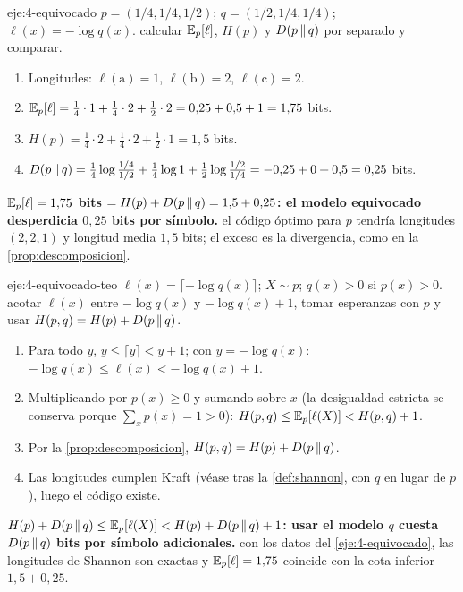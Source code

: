 \begin{solucion}{eje:4-equivocado}
\datos $p=(1/4,1/4,1/2)$; $q=(1/2,1/4,1/4)$; $\ell(x)=-\log q(x)$.
\planteamiento calcular $\mathbb{E}_p[\ell]$, $H(p)$ y $D(p\,\|\,q)$ por separado y comparar.
\pasos
\begin{enumerate}[label=\arabic*.]
  \item Longitudes: $\ell(\mathrm{a})=1$, $\ell(\mathrm{b})=2$, $\ell(\mathrm{c})=2$.
  \item $\mathbb{E}_p[\ell]=\tfrac14\cdot 1+\tfrac14\cdot 2+\tfrac12\cdot 2=0{,}25+0{,}5+1=1{,}75$ bits.
  \item $H(p)=\tfrac14\cdot 2+\tfrac14\cdot 2+\tfrac12\cdot 1=1{,}5$ bits.
  \item $D(p\,\|\,q)=\tfrac14\log\tfrac{1/4}{1/2}+\tfrac14\log 1+\tfrac12\log\tfrac{1/2}{1/4}=-0{,}25+0+0{,}5=0{,}25$ bits.
\end{enumerate}
\resultado \textbf{$\mathbb{E}_p[\ell]=1{,}75$ bits $=H(p)+D(p\,\|\,q)=1{,}5+0{,}25$: el modelo equivocado desperdicia $0{,}25$ bits por símbolo.}
\comprobacion el código óptimo para $p$ tendría longitudes $(2,2,1)$ y longitud media $1{,}5$ bits; el exceso es la divergencia, como en la \cref{prop:descomposicion}.
\end{solucion}

\begin{solucion}{eje:4-equivocado-teo}
\datos $\ell(x)=\lceil-\log q(x)\rceil$; $X\sim p$; $q(x)>0$ si $p(x)>0$.
\planteamiento acotar $\ell(x)$ entre $-\log q(x)$ y $-\log q(x)+1$, tomar esperanzas con $p$ y usar $H(p,q)=H(p)+D(p\,\|\,q)$.
\pasos
\begin{enumerate}[label=\arabic*.]
  \item Para todo $y$, $y\le\lceil y\rceil<y+1$; con $y=-\log q(x)$: $-\log q(x)\le\ell(x)<-\log q(x)+1$.
  \item Multiplicando por $p(x)\ge 0$ y sumando sobre $x$ (la desigualdad estricta se conserva porque $\sum_xp(x)=1>0$): $H(p,q)\le\mathbb{E}_p[\ell(X)]<H(p,q)+1$.
  \item Por la \cref{prop:descomposicion}, $H(p,q)=H(p)+D(p\,\|\,q)$.
  \item Las longitudes cumplen Kraft (véase tras la \cref{def:shannon}, con $q$ en lugar de $p$), luego el código existe.
\end{enumerate}
\resultado \textbf{$H(p)+D(p\,\|\,q)\le\mathbb{E}_p[\ell(X)]<H(p)+D(p\,\|\,q)+1$: usar el modelo $q$ cuesta $D(p\,\|\,q)$ bits por símbolo adicionales.}
\comprobacion con los datos del \cref{eje:4-equivocado}, las longitudes de Shannon son exactas y $\mathbb{E}_p[\ell]=1{,}75$ coincide con la cota inferior $1{,}5+0{,}25$.
\end{solucion}

